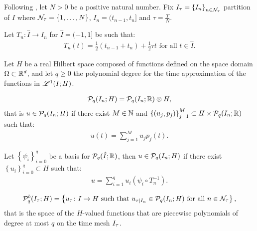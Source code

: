 Following \cite[p. 177]{Ern2021}, let $N > 0$ be a positive natural number. Fix $I_{\tau} = \left\{ I_n \right\}_{n \in \mathcal{N}_{\tau}}$ partition of $I$ where $\mathcal{N}_{\tau} = \left\{ 1, \dots, N \right\}$, $I_n = (t_{n - 1}, t_n]$ and $\tau = \frac{T}{N}$.

\begin{definition}[Mapping]
    Let $T_n \colon \hat{I} \rightarrow I_n$ for $\hat{I} = (-1, 1]$ be such that:
    \begin{gather}
        T_n(t) = \frac{1}{2}(t_{n - 1} + t_n) + \frac{1}{2} \tau t \text{ for all } t \in \hat{I}.
    \end{gather}
\end{definition}

Let $H$ be a real Hilbert space composed of functions defined on the space domain $\Omega \subset \mathbb{R}^{d}$, and let $q \geq 0$ the polynomial degree for the time approximation of the functions in $\mathscr{L}^{1}(I; H)$.

\begin{definition}[$\SpacePolynomials{q}(I_n; H)$]
    \begin{gather}
        \mathcal{P}_{q}(I_n; H) = \mathcal{P}_{q}(I_n; \mathbb{R}) \otimes H,
    \end{gather}
    that is $u \in \mathcal{P}_{q}(I_n; H)$ if there exist $M \in \mathbb{N}$ and $\left\{ (u_j, p_j) \right\}_{j = 1}^M \subset H \times \mathcal{P}_{q}(I_n; \mathbb{R})$ such that:
    \begin{gather}
        u(t) = \sum_{j = 1}^M u_j p_j(t).
    \end{gather}
\end{definition}

Let $\left\{ \psi_i \right\}_{i = 0}^q$ be a basis for $\mathcal{P}_{q}(\hat{I}; \mathbb{R})$, then $u \in \mathcal{P}_{q}(I_n; H)$ if there exist $\left\{ u_i \right\}_{i = 0}^q \subset H$ such that:
\begin{gather}
    u = \sum_{i = 1}^q u_i (\psi_i \circ T_n^{-1}).
\end{gather}

\begin{definition}
    \begin{gather}
        \mathcal{P}_{q}^b(I_{\tau}; H) = \left\{ u_{\tau} \colon I \rightarrow H \text{ such that } u_{\tau \mid I_n} \in \mathcal{P}_{q}(I_n; H) \text{ for all } n \in \mathcal{N}_{\tau} \right\},
    \end{gather}
    that is the space of the $H$-valued functions that are piecewise polynomials of degree at most $q$ on the time mesh $I_{\tau}$.
\end{definition}

